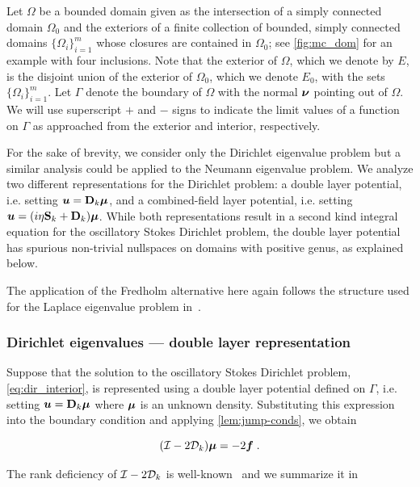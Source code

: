 Let $\Omega$ be a bounded domain given as
the intersection of a simply connected domain $\Omega_0$ and
the exteriors of a finite collection of bounded,
simply connected domains $\{ \Omega_i \}_{i=1}^m$
whose closures are contained in $\Omega_0$;
see \cref{fig:mc_dom} for an example with four inclusions.
Note that the
exterior of $\Omega$, which we denote by $E$, is the
disjoint union of the exterior of $\Omega_0$, which we
denote $E_0$, with the sets $\{ \Omega_i \}_{i=1}^m$.
Let $\Gamma$ denote the boundary of $\Omega$ with the normal
${\boldsymbol \nu}$ pointing out of $\Omega$.
We will use superscript $+$ and $-$ signs
to indicate the limit values of a function on $\Gamma$
as approached from the exterior and interior, respectively.

For the sake of brevity, we consider only the
Dirichlet eigenvalue problem but a similar analysis
could be applied to the Neumann eigenvalue problem.
We analyze two different representations for the
Dirichlet problem: a double layer potential,
i.e. setting ${\boldsymbol u}={\bf D}_{k} {\boldsymbol \mu}$, and a combined-field
layer potential, i.e. setting
${\boldsymbol u}=(i\eta {\bf S}_{k} + {\bf D}_{k}){\boldsymbol \mu}$. 
While both representations result in a second kind
integral equation for the oscillatory Stokes Dirichlet
problem, the double layer potential has spurious non-trivial
nullspaces on domains with positive genus, as
explained below.

\begin{remark}
  The application of the Fredholm alternative here
  again follows the structure used for the Laplace
  eigenvalue problem in~\cite[Ch. 3]{colton1983integral}.
\end{remark}


\subsubsection{Dirichlet eigenvalues --- double layer
  representation}
\label{subsec:dlanalysis}
Suppose that the solution to the oscillatory
Stokes Dirichlet problem, \cref{eq:dir_interior},
is represented using a double layer potential defined
on $\Gamma$, i.e. setting ${\boldsymbol u} = {\bf D}_{k} {\boldsymbol \mu}$ where
${\boldsymbol \mu}$ is an unknown density. 
Substituting this expression
into the boundary condition and applying
\cref{lem:jump-conds}, we obtain

\begin{equation}
  (\mathcal I - 2{\mathcal D}_{k}) {\boldsymbol \mu} = -2{\boldsymbol f} \; . \label{eq:inteq_dir_int}
\end{equation}

The rank deficiency of $\mathcal I-2{\mathcal D}_{k}$ is
well-known~\cite{biros2002embedded} and we summarize it
in

